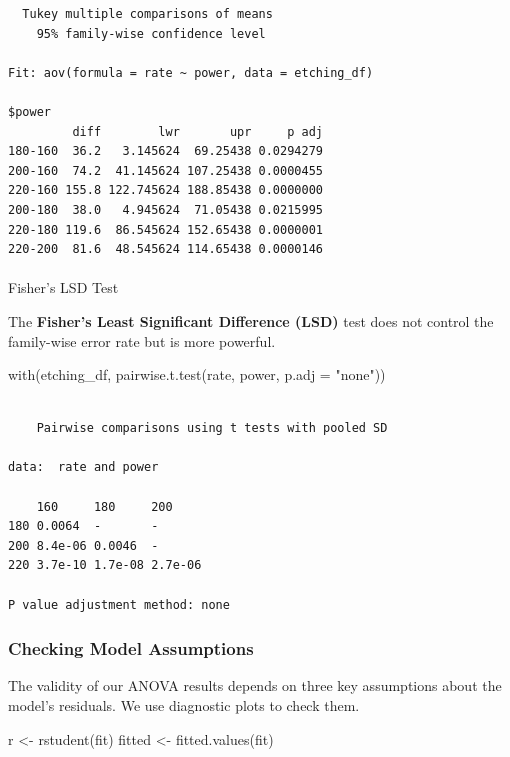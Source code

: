 \documentclass[
  letterpaper,
  DIV=11,
  numbers=noendperiod]{scrreprt}
\makeatletter
\let\oldparagraph\paragraph
\renewcommand{\paragraph}{
    \@ifstar
      \xxxParagraphStar
      \xxxParagraphNoStar
  }
\newcommand{\xxxParagraphStar}[1]{\oldparagraph*{#1}\mbox{}}
\newcommand{\xxxParagraphNoStar}[1]{\oldparagraph{#1}\mbox{}}
\newenvironment{Shaded}{\begin{snugshade}}{\end{snugshade}}
\newcommand{\AttributeTok}[1]{\textcolor[rgb]{0.40,0.45,0.13}{#1}}
\newcommand{\FunctionTok}[1]{\textcolor[rgb]{0.28,0.35,0.67}{#1}}
\newcommand{\NormalTok}[1]{\textcolor[rgb]{0.00,0.23,0.31}{#1}}
\newcommand{\OtherTok}[1]{\textcolor[rgb]{0.00,0.23,0.31}{#1}}
\newcommand{\StringTok}[1]{\textcolor[rgb]{0.13,0.47,0.30}{#1}}
\makeatother
\begin{document}
\begin{verbatim}
  Tukey multiple comparisons of means
    95% family-wise confidence level

Fit: aov(formula = rate ~ power, data = etching_df)

$power
         diff        lwr       upr     p adj
180-160  36.2   3.145624  69.25438 0.0294279
200-160  74.2  41.145624 107.25438 0.0000455
220-160 155.8 122.745624 188.85438 0.0000000
200-180  38.0   4.945624  71.05438 0.0215995
220-180 119.6  86.545624 152.65438 0.0000001
220-200  81.6  48.545624 114.65438 0.0000146
\end{verbatim}

\paragraph{Fisher's LSD Test}\label{fishers-lsd-test}

The \textbf{Fisher's Least Significant Difference (LSD)} test does not
control the family-wise error rate but is more powerful.

\begin{Shaded}
\begin{Highlighting}[]
\FunctionTok{with}\NormalTok{(etching\_df, }\FunctionTok{pairwise.t.test}\NormalTok{(rate, power, }\AttributeTok{p.adj =} \StringTok{"none"}\NormalTok{))}
\end{Highlighting}
\end{Shaded}

\begin{verbatim}

    Pairwise comparisons using t tests with pooled SD 

data:  rate and power 

    160     180     200    
180 0.0064  -       -      
200 8.4e-06 0.0046  -      
220 3.7e-10 1.7e-08 2.7e-06

P value adjustment method: none 
\end{verbatim}

\subsubsection{Checking Model
Assumptions}\label{checking-model-assumptions}

The validity of our ANOVA results depends on three key assumptions about
the model's residuals. We use diagnostic plots to check them.

\begin{Shaded}
\begin{Highlighting}[]
\NormalTok{r }\OtherTok{\textless{}{-}} \FunctionTok{rstudent}\NormalTok{(fit)}
\NormalTok{fitted }\OtherTok{\textless{}{-}} \FunctionTok{fitted.values}\NormalTok{(fit)}
\end{Highlighting}
\end{Shaded}
\end{document}
